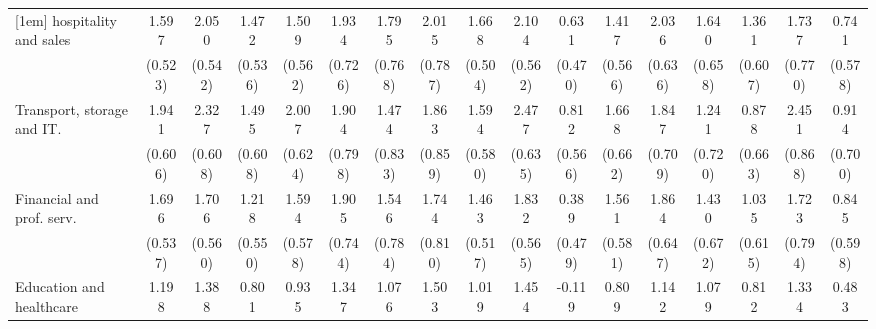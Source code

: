 {\begin{tabular}{l*{16}{c}}
[1em]
hospitality and sales&       1.597\sym{**} &       2.050\sym{***}&       1.472\sym{**} &       1.509\sym{**} &       1.934\sym{**} &       1.795\sym{*}  &       2.015\sym{*}  &       1.668\sym{***}&       2.104\sym{***}&       0.631         &       1.417\sym{*}  &       2.036\sym{**} &       1.640\sym{*}  &       1.361\sym{*}  &       1.737\sym{*}  &       0.741         \\
                    &     (0.523)         &     (0.542)         &     (0.536)         &     (0.562)         &     (0.726)         &     (0.768)         &     (0.787)         &     (0.504)         &     (0.562)         &     (0.470)         &     (0.566)         &     (0.636)         &     (0.658)         &     (0.607)         &     (0.770)         &     (0.578)         \\
[1em]
Transport, storage and IT.&       1.941\sym{**} &       2.327\sym{***}&       1.495\sym{*}  &       2.007\sym{**} &       1.904\sym{*}  &       1.474         &       1.863\sym{*}  &       1.594\sym{**} &       2.477\sym{***}&       0.812         &       1.668\sym{*}  &       1.847\sym{**} &       1.241         &       0.878         &       2.451\sym{**} &       0.914         \\
                    &     (0.606)         &     (0.608)         &     (0.608)         &     (0.624)         &     (0.798)         &     (0.833)         &     (0.859)         &     (0.580)         &     (0.635)         &     (0.566)         &     (0.662)         &     (0.709)         &     (0.720)         &     (0.663)         &     (0.868)         &     (0.700)         \\
[1em]
Financial and prof. serv.&       1.696\sym{**} &       1.706\sym{**} &       1.218\sym{*}  &       1.594\sym{**} &       1.905\sym{*}  &       1.546\sym{*}  &       1.744\sym{*}  &       1.463\sym{**} &       1.832\sym{**} &       0.389         &       1.561\sym{**} &       1.864\sym{**} &       1.430\sym{*}  &       1.035         &       1.723\sym{*}  &       0.845         \\
                    &     (0.537)         &     (0.560)         &     (0.550)         &     (0.578)         &     (0.744)         &     (0.784)         &     (0.810)         &     (0.517)         &     (0.565)         &     (0.479)         &     (0.581)         &     (0.647)         &     (0.672)         &     (0.615)         &     (0.794)         &     (0.598)         \\
[1em]
Education and healthcare&       1.198\sym{*}  &       1.388\sym{*}  &       0.801         &       0.935         &       1.347         &       1.076         &       1.503         &       1.019         &       1.454\sym{*}  &      -0.119         &       0.809         &       1.142         &       1.079         &       0.812         &       1.334         &       0.483         \\

\end{tabular}}
